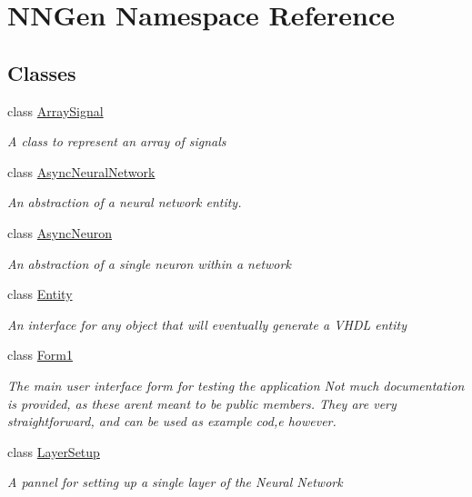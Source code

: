 \hypertarget{namespace_n_n_gen}{}\section{N\+N\+Gen Namespace Reference}
\label{namespace_n_n_gen}
\subsection*{Classes}
\begin{DoxyCompactItemize}
\item 
class \hyperlink{class_n_n_gen_1_1_array_signal}{Array\+Signal}
\begin{DoxyCompactList}\small\item\em A class to represent an array of signals \end{DoxyCompactList}\item 
class \hyperlink{class_n_n_gen_1_1_async_neural_network}{Async\+Neural\+Network}
\begin{DoxyCompactList}\small\item\em An abstraction of a neural network entity. \end{DoxyCompactList}\item 
class \hyperlink{class_n_n_gen_1_1_async_neuron}{Async\+Neuron}
\begin{DoxyCompactList}\small\item\em An abstraction of a single neuron within a network \end{DoxyCompactList}\item 
class \hyperlink{class_n_n_gen_1_1_entity}{Entity}
\begin{DoxyCompactList}\small\item\em An interface for any object that will eventually generate a V\+H\+D\+L entity \end{DoxyCompactList}\item 
class \hyperlink{class_n_n_gen_1_1_form1}{Form1}
\begin{DoxyCompactList}\small\item\em The main user interface form for testing the application Not much documentation is provided, as these aren\textquotesingle{}t meant to be public members. They are very straightforward, and can be used as example cod,e however. \end{DoxyCompactList}\item 
class \hyperlink{class_n_n_gen_1_1_layer_setup}{Layer\+Setup}
\begin{DoxyCompactList}\small\item\em A pannel for setting up a single layer of the Neural Network \end{DoxyCompactList}\item 

\end{DoxyCompactItemize}
